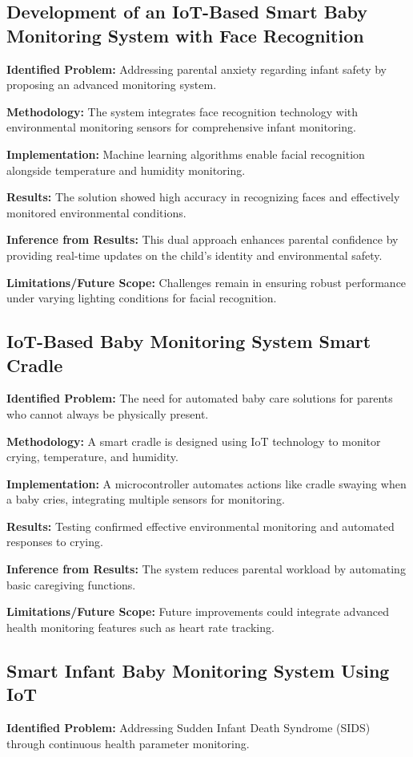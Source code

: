 \documentclass[conference]{IEEEtran}
\begin{document}
\subsection{Development of an IoT-Based Smart Baby Monitoring System with Face Recognition}
\textbf{Identified Problem:} Addressing parental anxiety regarding infant safety by proposing an advanced monitoring system.

\textbf{Methodology:} The system integrates face recognition technology with environmental monitoring sensors for comprehensive infant monitoring.

\textbf{Implementation:} Machine learning algorithms enable facial recognition alongside temperature and humidity monitoring.

\textbf{Results:} The solution showed high accuracy in recognizing faces and effectively monitored environmental conditions.

\textbf{Inference from Results:} This dual approach enhances parental confidence by providing real-time updates on the child’s identity and environmental safety.

\textbf{Limitations/Future Scope:} Challenges remain in ensuring robust performance under varying lighting conditions for facial recognition.

\subsection{IoT-Based Baby Monitoring System Smart Cradle}
\textbf{Identified Problem:} The need for automated baby care solutions for parents who cannot always be physically present.

\textbf{Methodology:} A smart cradle is designed using IoT technology to monitor crying, temperature, and humidity.

\textbf{Implementation:} A microcontroller automates actions like cradle swaying when a baby cries, integrating multiple sensors for monitoring.

\textbf{Results:} Testing confirmed effective environmental monitoring and automated responses to crying.

\textbf{Inference from Results:} The system reduces parental workload by automating basic caregiving functions.

\textbf{Limitations/Future Scope:} Future improvements could integrate advanced health monitoring features such as heart rate tracking.

\subsection{Smart Infant Baby Monitoring System Using IoT}
\textbf{Identified Problem:} Addressing Sudden Infant Death Syndrome (SIDS) through continuous health parameter monitoring.
\end{document}
